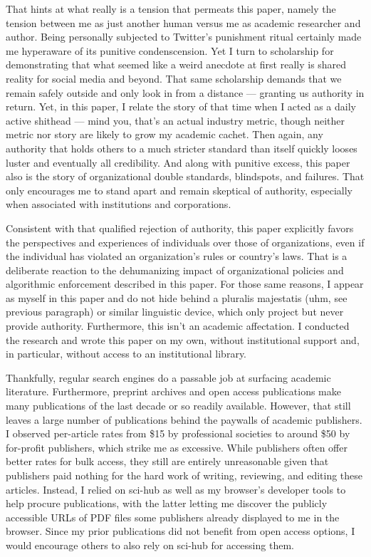 That hints at what really is a tension that permeats this paper, namely the
tension between me as just another human versus me as academic researcher and
author. Being personally subjected to Twitter's punishment ritual certainly made
me hyperaware of its punitive condenscension. Yet I turn to scholarship for
demonstrating that what seemed like a weird anecdote at first really is shared
reality for social media and beyond. That same scholarship demands that we
remain safely outside and only look in from a distance --- granting us authority
in return. Yet, in this paper, I relate the story of that time when I acted as a
daily active shithead --- mind you, that's an actual industry metric, though
neither metric nor story are likely to grow my academic cachet. Then again, any
authority that holds others to a much stricter standard than itself quickly
looses luster and eventually all credibility. And along with punitive excess,
this paper also is the story of organizational double standards, blindspots, and
failures. That only encourages me to stand apart and remain skeptical of
authority, especially when associated with institutions and corporations.

Consistent with that qualified rejection of authority, this paper explicitly
favors the perspectives and experiences of individuals over those of
organizations, even if the individual has violated an organization's rules or
country's laws. That is a deliberate reaction to the dehumanizing impact of
organizational policies and algorithmic enforcement described in this paper. For
those same reasons, I appear as myself in this paper and do not hide behind a
pluralis majestatis (uhm, see previous paragraph) or similar linguistic device,
which only project but never provide authority. Furthermore, this isn't an
academic affectation. I conducted the research and wrote this paper on my own,
without institutional support and, in particular, without access to an
institutional library.

Thankfully, regular search engines do a passable job at surfacing academic
literature. Furthermore, preprint archives and open access publications make
many publications of the last decade or so readily available. However, that
still leaves a large number of publications behind the paywalls of academic
publishers. I observed per-article rates from \$15 by professional societies to
around \$50 by for-profit publishers, which strike me as excessive. While
publishers often offer better rates for bulk access, they still are entirely
unreasonable given that publishers paid nothing for the hard work of writing,
reviewing, and editing these articles. Instead, I relied on sci-hub as well as
my browser's developer tools to help procure publications, with the latter
letting me discover the publicly accessible URLs of PDF files some publishers
already displayed to me in the browser. Since my prior publications did not
benefit from open access options, I would encourage others to also rely on
sci-hub for accessing them.


